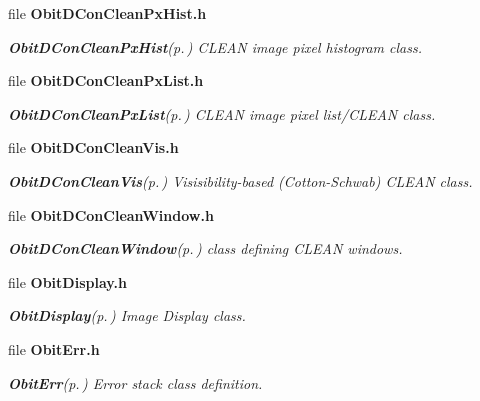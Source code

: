 \begin{CompactItemize}
\item 
file {\bf Obit\-DCon\-Clean\-Px\-Hist.h}
\begin{CompactList}\small\item\em {\bf Obit\-DCon\-Clean\-Px\-Hist}{\rm (p.\,\pageref{structObitDConCleanPxHist})} CLEAN image pixel histogram class. \item\end{CompactList}

\item 
file {\bf Obit\-DCon\-Clean\-Px\-List.h}
\begin{CompactList}\small\item\em {\bf Obit\-DCon\-Clean\-Px\-List}{\rm (p.\,\pageref{structObitDConCleanPxList})} CLEAN image pixel list/CLEAN class. \item\end{CompactList}

\item 
file {\bf Obit\-DCon\-Clean\-Vis.h}
\begin{CompactList}\small\item\em {\bf Obit\-DCon\-Clean\-Vis}{\rm (p.\,\pageref{structObitDConCleanVis})} Visisibility-based (Cotton-Schwab) CLEAN class. \item\end{CompactList}

\item 
file {\bf Obit\-DCon\-Clean\-Window.h}
\begin{CompactList}\small\item\em {\bf Obit\-DCon\-Clean\-Window}{\rm (p.\,\pageref{structObitDConCleanWindow})} class defining CLEAN windows. \item\end{CompactList}

\item 
file {\bf Obit\-Display.h}
\begin{CompactList}\small\item\em {\bf Obit\-Display}{\rm (p.\,\pageref{structObitDisplay})} Image Display class. \item\end{CompactList}

\item 
file {\bf Obit\-Err.h}
\begin{CompactList}\small\item\em {\bf Obit\-Err}{\rm (p.\,\pageref{structObitErr})} Error stack class definition. \item\end{CompactList}


\end{CompactItemize}
